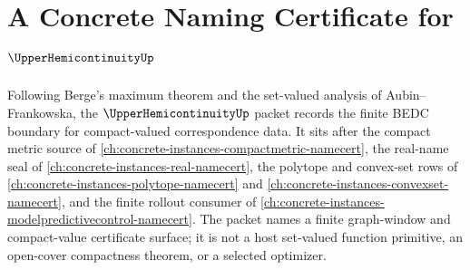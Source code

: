 \chapter{A Concrete Naming Certificate for $\UpperHemicontinuityUp$}
\label{ch:concrete-instances-upperhemicontinuity-namecert}

Following Berge's maximum theorem and the set-valued analysis of Aubin--Frankowska, the $\UpperHemicontinuityUp$ packet records the finite BEDC boundary for compact-valued correspondence data. It sits after the compact metric source of \autoref{ch:concrete-instances-compactmetric-namecert}, the real-name seal of \autoref{ch:concrete-instances-real-namecert}, the polytope and convex-set rows of \autoref{ch:concrete-instances-polytope-namecert} and \autoref{ch:concrete-instances-convexset-namecert}, and the finite rollout consumer of \autoref{ch:concrete-instances-modelpredictivecontrol-namecert}. The packet names a finite graph-window and compact-value certificate surface; it is not a host set-valued function primitive, an open-cover compactness theorem, or a selected optimizer.

